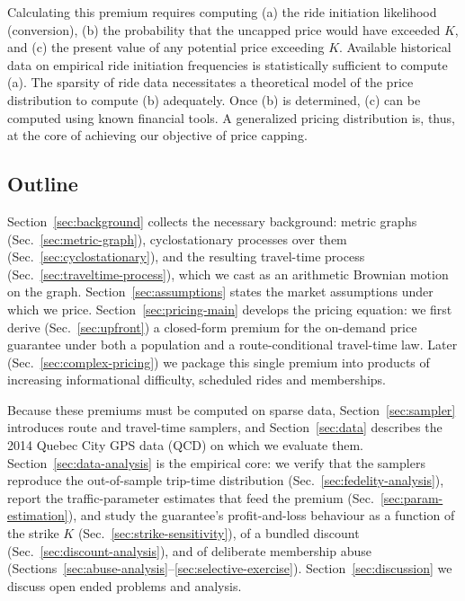\documentclass[12pt]{article}
\begin{document}
Calculating this premium requires computing (a) the ride initiation likelihood
(conversion), (b) the probability that the uncapped price would have exceeded
$K$, and (c) the present value of any potential price exceeding $K$. Available
historical data on empirical ride initiation frequencies is statistically
sufficient to compute (a). The sparsity of ride data necessitates a theoretical
model of the price distribution to compute (b) adequately. Once (b) is
determined, (c) can be computed using known financial tools. A generalized
pricing distribution is, thus, at the core of achieving our objective of price
capping.

\subsection{Outline}
Section~\ref{sec:background} collects the necessary background: metric graphs
(Sec.~\ref{sec:metric-graph}), cyclostationary processes over them
(Sec.~\ref{sec:cyclostationary}), and the resulting travel-time process
(Sec.~\ref{sec:traveltime-process}), which we cast as an arithmetic Brownian motion
on the graph. Section~\ref{sec:assumptions} states the market assumptions under
which we price. Section~\ref{sec:pricing-main} develops the pricing equation: we
first derive (Sec.~\ref{sec:upfront}) a closed-form premium for the
on-demand price guarantee under both a population and a route-conditional
travel-time law. Later (Sec.~\ref{sec:complex-pricing}) we package this single premium into products of increasing informational difficulty, scheduled rides and memberships.

Because these premiums must be computed on sparse data, Section~\ref{sec:sampler} introduces route and travel-time samplers, and Section~\ref{sec:data} describes the 2014 Quebec City GPS data (QCD) on which we evaluate them. Section~\ref{sec:data-analysis} is the empirical core: we verify that the samplers reproduce the out-of-sample trip-time distribution (Sec.~\ref{sec:fedelity-analysis}), report the traffic-parameter estimates that feed the premium (Sec.~\ref{sec:param-estimation}), and study the guarantee's profit-and-loss behaviour as a function of the strike $K$
(Sec.~\ref{sec:strike-sensitivity}), of a bundled discount
(Sec.~\ref{sec:discount-analysis}), and of deliberate membership abuse
(Sections~\ref{sec:abuse-analysis}--\ref{sec:selective-exercise}). Section~\ref{sec:discussion} we discuss open ended problems and analysis.
\end{document}
